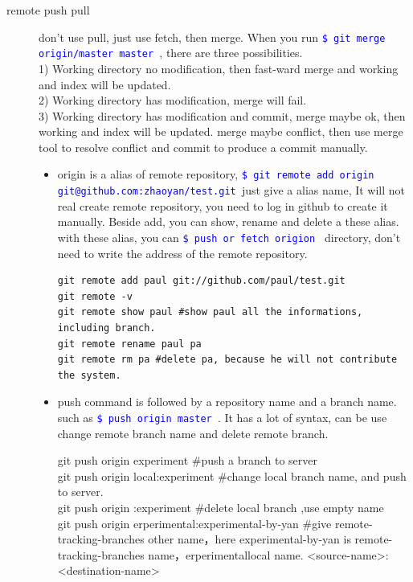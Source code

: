 \documentclass[a4paper,12pt,twoside]{book}
\newcommand{\linuxcommand}[1]{\texttt{\textcolor{blue}{\$ #1 \Pisymbol{psy}{191}}}}
\begin{document}
\begin{description}
\item[remote push pull] don't use pull, just use fetch, then merge. 
When you run \linuxcommand{git merge origin/master master}, there are three possibilities. \\
1) Working directory no modification, then fast-ward merge and working and index will be updated. \\
2) Working directory has modification, merge will fail. \\
3) Working directory has modification and commit, merge maybe ok, then working and index will be updated. merge maybe conflict, then use merge tool to resolve conflict and commit to produce a commit manually. \\

\begin{itemize}
\item origin is a alias of remote repository,  \linuxcommand{git remote add origin
    git@github.com:zhaoyan/test.git}just give a alias name, It will not real create remote repository, you need to
    log in github to create it manually.  Beside add, you can show, rename and delete a these alias. with these
    alias, you can \linuxcommand{push or fetch origion} directory, don't need to write the address of the remote
    repository.

\begin{verbatim}
git remote add paul git://github.com/paul/test.git
git remote -v
git remote show paul #show paul all the informations, including branch.
git remote rename paul pa
git remote rm pa #delete pa, because he will not contribute the system.
\end{verbatim}

\item push command is followed by a repository name and a branch name.  such as \linuxcommand{push
    origin master}. It has a lot of syntax, can be use change remote branch name and delete remote branch.

git push origin experiment \#push a branch to server\\
git push origin local:experiment \#change local branch name, and push to server.  \\
git push origin :experiment \#delete local branch ,use empty name \\
git push origin erperimental:experimental-by-yan \#give remote-tracking-branches other name，here
experimental-by-yan is remote-tracking-branches name，erperimentallocal name.
<source-name>:<destination-name> \par


\end{itemize}
\end{description}
\end{document}
